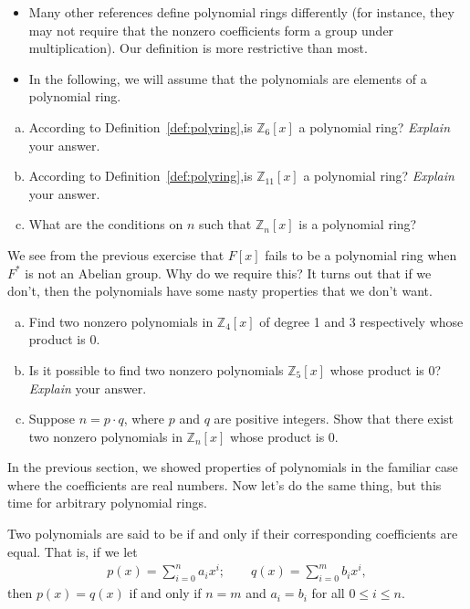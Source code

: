 \begin{rem}
\begin{itemize}
\item
Many other references define polynomial rings differently (for instance, they may not require that the nonzero coefficients form a group under multiplication). Our definition is more restrictive than most.
\item
In the following, we will assume that the polynomials are elements of a polynomial ring.
\end{itemize}
\end{rem}

\begin{exercise}
\begin{enumerate}[(a)]
\item
According to Definition~\ref{def:polyring},is $\mathbb{Z}_6[x]$ a polynomial ring? \emph{Explain} your answer.
\item
According to Definition~\ref{def:polyring},is $\mathbb{Z}_{11}[x]$ a polynomial ring? \emph{Explain} your answer.
\item
What are the conditions on $n$ such that $\mathbb{Z}_n[x]$ is a polynomial ring?
\end{enumerate}
\end{exercise}
We see from the previous exercise that $F[x]$ fails to be a polynomial ring when $F^*$ is not an Abelian group. Why do we require this? It turns out that if we don't, then the polynomials have some nasty properties that we don't want.

\begin{exercise}
\begin{enumerate}[(a)]
\item
Find two nonzero polynomials in $\mathbb{Z}_4[x]$ of degree 1 and 3 respectively  whose product is 0.
\item
Is it possible to find two nonzero polynomials $\mathbb{Z}_5[x]$ whose product is 0? \emph{Explain} your answer.
\item
Suppose $n=p\cdot q$, where $p$ and $q$ are positive integers. Show that there exist two nonzero polynomials in $\mathbb{Z}_n[x]$ whose product is 0.
\end{enumerate}
\end{exercise}
In the previous section, we showed properties of polynomials in the familiar case where the coefficients are real numbers. Now let's 
do the same thing, but this time for arbitrary polynomial rings.
 
\begin{defn} Two polynomials are said to be   if and only if their corresponding coefficients are equal. That is, if we let    
\begin{align*}
p(x)  = \sum^{n}_{i=0} a_i x^i; \qquad
q(x)  = \sum^{m}_{i=0} b_i x^i,
\end{align*}
then $p(x) = q(x)$ if and only if $n=m$ and $a_i = b_i$ for all $0 \leq i \leq n$.
\end {defn}

